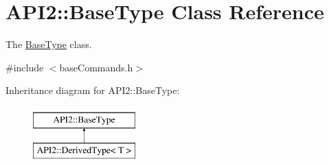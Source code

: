 \hypertarget{class_a_p_i2_1_1_base_type}{\section{A\-P\-I2\-:\-:Base\-Type Class Reference}
\label{class_a_p_i2_1_1_base_type}
}


The \hyperlink{class_a_p_i2_1_1_base_type}{Base\-Type} class.  




{\ttfamily \#include $<$base\-Commands.\-h$>$}

Inheritance diagram for A\-P\-I2\-:\-:Base\-Type\-:\begin{figure}[H]
\begin{center}
\leavevmode
\includegraphics[height=2.000000cm]{class_a_p_i2_1_1_base_type}
\end{center}
\end{figure}
